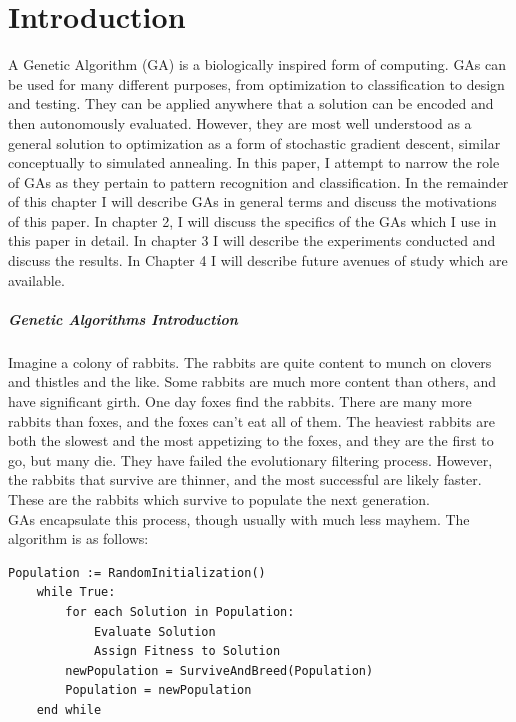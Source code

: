\chapter{Introduction} \label{ch:introduction}

A Genetic Algorithm (GA) is a biologically inspired form of computing.  GAs can be used for many different purposes, from optimization to classification to design and testing.  They can be applied anywhere that a solution can be encoded and then autonomously evaluated.  However, they are most well understood as a general solution to optimization as a form of stochastic gradient descent, similar conceptually to simulated annealing. In this paper, I attempt to narrow the role of GAs as they pertain to pattern recognition and classification.  In the remainder of this chapter I will describe GAs in general terms and discuss the motivations of this paper.  In chapter 2, I will discuss the specifics of the GAs which I use in this paper in detail.  In chapter 3 I will describe the experiments conducted and discuss the results.  In Chapter 4 I will describe future avenues of study which are available. 

\paragraph{Genetic Algorithms Introduction}
Imagine a colony of rabbits.  The rabbits are quite content to munch on clovers and thistles and the like.  Some rabbits are much more content than others, and have significant girth.  One day foxes find the rabbits. There are many more rabbits than foxes, and the foxes can't eat all of them.  The heaviest rabbits are both the slowest and the most appetizing to the foxes, and they are the first to go, but many die.  They have failed the evolutionary filtering process.  However, the rabbits that survive are thinner, and the most successful are likely faster.  These are the rabbits which survive to populate the next generation.
\\GAs encapsulate this process, though usually with much less mayhem.  The algorithm is as follows:
\begin{lstlisting}[language = algorithm, caption={Basic GA}, label={fig:basicga}]
Population := RandomInitialization()
	while True:
		for each Solution in Population:
			Evaluate Solution
			Assign Fitness to Solution
		newPopulation = SurviveAndBreed(Population)
		Population = newPopulation
	end while
\end{lstlisting}

